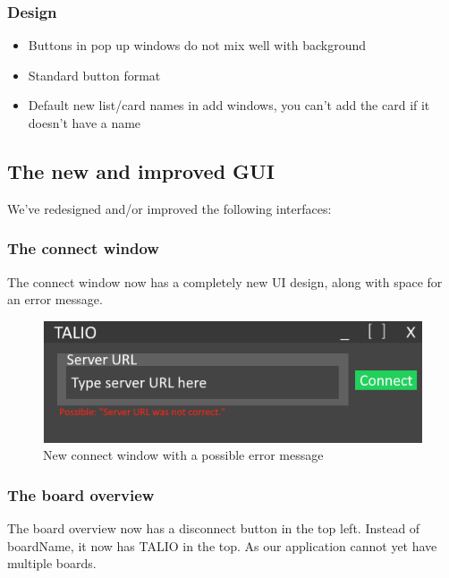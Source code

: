 \subsubsection{Design}
\begin{itemize}
    \item Buttons in pop up windows do not mix well with background 
    \item Standard button format
    \item Default new list/card names in add windows, you can't add the card if it doesn't have a name
\end{itemize}

\subsection{The new and improved GUI}
We've redesigned and/or improved the following interfaces:

\subsubsection{The connect window}
The connect window now has a completely new UI design, along with space for an error message.

\begin{figure}
    \centering
    \includegraphics{images/TALIOconnect.png}
    \caption{New connect window with a possible error message}
    \label{fig:Connect Window}
\end{figure}

\subsubsection{The board overview}
The board overview now has a disconnect button in the top left. Instead of boardName, it now has TALIO in the top. As our application cannot yet have multiple boards. 

